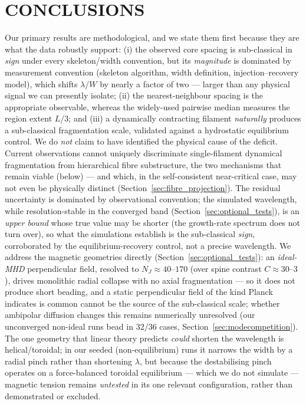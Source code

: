 \documentclass[usenatbib,twoside,twocolumn]{mnras}
\begin{document}
\section{CONCLUSIONS}

Our primary results are methodological, and we state them first because they are what the data robustly support: (i) the observed core spacing is sub-classical in \emph{sign} under every skeleton/width convention, but its \emph{magnitude} is dominated by measurement convention (skeleton algorithm, width definition, injection--recovery model), which shifts $\lambda/W$ by nearly a factor of two --- larger than any physical signal we can presently isolate; (ii) the nearest-neighbour spacing is the appropriate observable, whereas the widely-used pairwise median measures the region extent $L/3$; and (iii) a dynamically contracting filament \emph{naturally} produces a sub-classical fragmentation scale, validated against a hydrostatic equilibrium control. We do \emph{not} claim to have identified the physical cause of the deficit. Current observations cannot uniquely discriminate single-filament dynamical fragmentation from hierarchical fibre substructure, the two mechanisms that remain viable (below) --- and which, in the self-consistent near-critical case, may not even be physically distinct (Section~\ref{sec:fibre_projection}). The residual uncertainty is dominated by observational convention; the simulated wavelength, while resolution-stable in the converged band (Section~\ref{sec:optional_tests}), is an \emph{upper bound} whose true value may be shorter (the growth-rate spectrum does not turn over), so what the simulations establish is the sub-classical \emph{sign}, corroborated by the equilibrium-recovery control, not a precise wavelength. We address the magnetic geometries directly (Section~\ref{sec:optional_tests}): an \emph{ideal-MHD} perpendicular field, resolved to $N_J\approx40$--$170$ (over spine contrast $C\approx30$--$3$), drives monolithic radial collapse with no axial fragmentation --- so it does not produce short beading, and a static perpendicular field of the kind Planck indicates is common cannot be the source of the sub-classical scale; whether ambipolar diffusion changes this remains numerically unresolved (our unconverged non-ideal runs bead in $32/36$ cases, Section~\ref{sec:modecompetition}). The one geometry that linear theory predicts \emph{could} shorten the wavelength is helical/toroidal; in our seeded (non-equilibrium) runs it narrows the width by a radial pinch rather than shortening $\lambda$, but because the destabilising \citet{Fiege2000} pinch operates on a force-balanced toroidal equilibrium --- which we do not simulate --- magnetic tension remains \emph{untested} in its one relevant configuration, rather than demonstrated or excluded.
\end{document}
